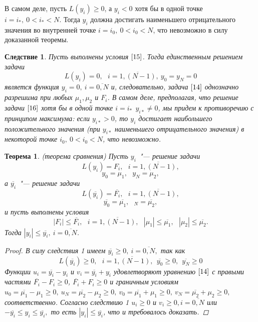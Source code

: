 \documentclass[11pt,a4paper,twoside,listtotoc,bibtotoc]{report}
\numberwithin{equation}{section}
\theoremstyle{definition}
\theoremstyle{plain}
\newtheorem{theorem}{Теорема}[section]
\newtheorem{cons}{Следствие}[section]
\begin{document}
В самом деле, пусть $L(y_i) \geqslant 0$,  а $y_i < 0$ хотя бы в одной точке
$i=i_*,~ 0<i_*<N$. Тогда $y_i$ должна достигать наименьшего отрицательного
значения во внутренней точке $i=i_0,~ 0<i_0<N$, что невозможно в силу
доказанной теоремы.
%
\begin{cons}
%
    Пусть выполнены условия $\eqref{15}$. Тогда единственным решением задачи
    \begin{equation}
        \label{16}
        L(y_i)=0,~~~i=\overline{1,(N-1)}, ~y_0=y_N=0
    \end{equation}
    является функция $y_i = 0,~i=\overline{0,N}$ и, следовательно, задача
    $\eqref{14}$ однозначно разрешима при любых $\mu_1, \mu_2$ и $F_i$.
    В самом деле, предполагая, что решение задачи $\eqref{16}$ хотя бы в одной
    точке $i=i_*~~y_{i*} \neq 0$, мы придем к противоречию с принципом максимума:
    если $y_{i*} > 0$, то $y_i$ достигает наибольшего положительного значения
    (при $y_{i*}$ наименьшего отрицательного значения) в некоторой точке
    $i_0,~0<i_0<N$, что невозможно.
%
\end{cons}
%
%
\begin{theorem}
%
    (теорема сравнения) Пусть $y_i$~"--- решение задачи
    $$
        L(y_i) = F_i,~~~i=\overline{1,(N-1)},
    $$
    $$
        y_0 = \mu_1,~~~y_N = \mu_2,
    $$
    а $\overline{y_i}$~"--- решение задачи
    $$
        L(\overline{y_i}) = \overline{F_i},~~~i=\overline{1,(N-1)},
    $$
     $$
        \overline{y_0} = \overline{\mu_1},~~~\overline{_N} = \overline{\mu_2},
    $$
    и пусть выполнены условия
    $$
        |F_i| \leqslant \overline{F_i},~~~i=\overline{1,(N-1)},
        ~~~|\mu_1| \leqslant \overline{\mu_1},~~~|\mu_2| \leqslant \overline{\mu_2}.
    $$
    Тогда $|y_i| \leqslant \overline{y_i},~i=\overline{0,N}$.
    \begin{proof}
        В силу следствия 1 имеем $\overline{y_i} \geqslant 0,~i=\overline{0,N},$ так как
        $$
            L(\overline{y_i}) \geqslant 0,~~~i=\overline{1,(N-1)},
            ~~\overline{y_0} \geqslant 0, ~~\overline{y_N} \geqslant 0
        $$
        Функции $u_i = \overline{y_i} - y_i$ и $v_i = \overline{y_i} + y_i$
        удовлетворяют уравнению $\eqref{14}$ с правыми частями
        $\overline{F_i}-F_i \geqslant 0$, $\overline{F_i}+F_i \geqslant 0$
        и граничным условиям
        $u_0 = \overline{\mu_1} - \mu_1 \geqslant 0,
        ~u_N = \overline{\mu_2} - \mu_2 \geqslant 0,
        ~v_0 = \overline{\mu_1} + \mu_1 \geqslant 0,
        ~v_N = \overline{\mu_2} + \mu_2 \geqslant 0,$ соответственно.
        Согласно следствию 1 $u_i \geqslant 0$ и $v_i \geqslant 0, i=\overline{0,N}$
        или $-\overline{y_i}\leqslant y_i \leqslant \overline{y_i},$
        то есть $|y_i| \leqslant \overline{y_i}$, что и требовалось доказать.
    \end{proof}
%
\end{theorem}
%
\end{document}
